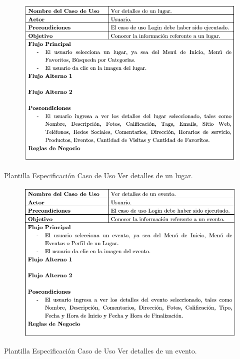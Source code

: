 \documentclass[12pt,letterpaper,openany]{book}
\begin{document}
\begin{table}[H]
\begin{center}
\begin{figure}[H]
\begin{center}
\includegraphics[width=13cm]{./imagenes/PCU/ver_detalles_lugar}
\end{center}
\end{figure}
\end{center}
\caption{Plantilla Especificación Caso de Uso Ver detalles de un lugar.}
\end{table}

\begin{table}[H]
\begin{center}
\begin{figure}[H]
\begin{center}
\includegraphics[width=13cm]{./imagenes/PCU/ver_detalles_evento}
\end{center}
\end{figure}
\end{center}
\caption{Plantilla Especificación Caso de Uso Ver detalles de un evento.}
\end{table}
\end{document}
